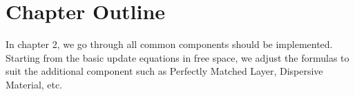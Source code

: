 \section{Chapter Outline}

In chapter 2, we go through all common components should be implemented. Starting from the basic update equations in
free space, we adjust the formulas to suit the additional component such as Perfectly Matched Layer, Dispersive
Material, etc.
